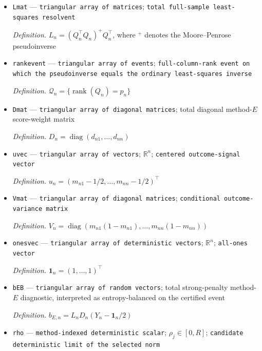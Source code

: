 \documentclass{article}
\begin{document}
\begin{itemize}
  \par\smallskip\noindent\emph{Definition.} \(Q_n\) has row \(i\) equal to \(q_{ni}^\top\)
  \item \texttt{Lmat} --- \texttt{triangular array of matrices}; \texttt{total full-\allowbreak{}sample least-\allowbreak{}squares resolvent}
  \par\smallskip\noindent\emph{Definition.} \(L_n=(Q_n^\top Q_n)^{+}Q_n^\top\), where \({}^{+}\) denotes the Moore--Penrose pseudoinverse
  \item \texttt{rankevent} --- \texttt{triangular array of events}; \texttt{full-\allowbreak{}column-\allowbreak{}rank event on which the pseudoinverse equals the ordinary least-\allowbreak{}squares inverse}
  \par\smallskip\noindent\emph{Definition.} \(\mathcal Q_n=\{\operatorname{rank}(Q_n)=p_n\}\)
  \item \texttt{Dmat} --- \texttt{triangular array of diagonal matrices}; total diagonal method-\(E\) score-weight matrix
  \par\smallskip\noindent\emph{Definition.} \(D_n=\operatorname{diag}(d_{n1},\ldots,d_{nn})\)
  \item \texttt{uvec} --- \texttt{triangular array of vectors}; \(\mathbb R^n\); \texttt{centered outcome-\allowbreak{}signal vector}
  \par\smallskip\noindent\emph{Definition.} \(u_n=(m_{n1}-1/2,\ldots,m_{nn}-1/2)^\top\)
  \item \texttt{Vmat} --- \texttt{triangular array of diagonal matrices}; \texttt{conditional outcome-\allowbreak{}variance matrix}
  \par\smallskip\noindent\emph{Definition.} \(V_n=\operatorname{diag}(m_{n1}(1-m_{n1}),\ldots,m_{nn}(1-m_{nn}))\)
  \item \texttt{onesvec} --- \texttt{triangular array of deterministic vectors}; \(\mathbb R^n\); \texttt{all-\allowbreak{}ones vector}
  \par\smallskip\noindent\emph{Definition.} \(\mathbf 1_n=(1,\ldots,1)^\top\)
  \item \texttt{bEB} --- \texttt{triangular array of random vectors}; total strong-penalty method-\(E\) diagnostic, interpreted as entropy-balanced on the certified event
  \par\smallskip\noindent\emph{Definition.} \(b_{E,n}=L_nD_n(Y_n-\mathbf 1_n/2)\)
  \item \texttt{rho} --- \texttt{method-\allowbreak{}indexed deterministic scalar}; \(\rho_j\in[0,R]\); \texttt{candidate deterministic limit of the selected norm}

\end{itemize}
\end{document}
